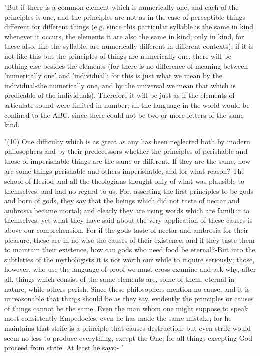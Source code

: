 "But if there is a common element which is numerically one, and each
of the principles is one, and the principles are not as in the case
of perceptible things different for different things (e.g. since this
particular syllable is the same in kind whenever it occurs, the elements
it are also the same in kind; only in kind, for these also, like the
syllable, are numerically different in different contexts),-if it
is not like this but the principles of things are numerically one,
there will be nothing else besides the elements (for there is no difference
of meaning between 'numerically one' and 'individual'; for this is
just what we mean by the individual-the numerically one, and by the
universal we mean that which is predicable of the individuals). Therefore
it will be just as if the elements of articulate sound were limited
in number; all the language in the world would be confined to the
ABC, since there could not be two or more letters of the same kind.

"(10) One difficulty which is as great as any has been neglected both
by modern philosophers and by their predecessors-whether the principles
of perishable and those of imperishable things are the same or different.
If they are the same, how are some things perishable and others imperishable,
and for what reason? The school of Hesiod and all the theologians
thought only of what was plausible to themselves, and had no regard
to us. For, asserting the first principles to be gods and born of
gods, they say that the beings which did not taste of nectar and ambrosia
became mortal; and clearly they are using words which are familiar
to themselves, yet what they have said about the very application
of these causes is above our comprehension. For if the gods taste
of nectar and ambrosia for their pleasure, these are in no wise the
causes of their existence; and if they taste them to maintain their
existence, how can gods who need food be eternal?-But into the subtleties
of the mythologists it is not worth our while to inquire seriously;
those, however, who use the language of proof we must cross-examine
and ask why, after all, things which consist of the same elements
are, some of them, eternal in nature, while others perish. Since these
philosophers mention no cause, and it is unreasonable that things
should be as they say, evidently the principles or causes of things
cannot be the same. Even the man whom one might suppose to speak most
consistently-Empedocles, even he has made the same mistake; for he
maintains that strife is a principle that causes destruction, but
even strife would seem no less to produce everything, except the One;
for all things excepting God proceed from strife. At least he says:-
"


